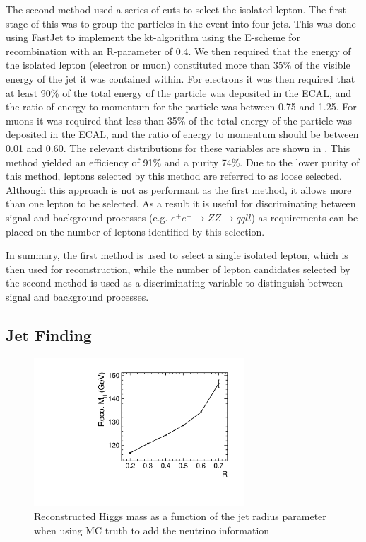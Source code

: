 The second method used a series of cuts to select the isolated lepton. The first stage of this was to group the particles in the event into four jets. This was done using FastJet \cite{Cacciari:2011ma} to implement the kt-algorithm using the E-scheme for recombination with an R-parameter of 0.4. We then required that the energy of the isolated lepton (electron or muon) constituted more than 35\% of the visible energy of the jet it was contained within. For electrons it was then required that at least 90\% of the total energy of the particle was deposited in the ECAL, and the ratio of energy to momentum for the particle was between 0.75 and 1.25. For muons it was required that less than 35\% of the total energy of the particle was deposited in the ECAL, and the ratio of energy to momentum should be between 0.01 and 0.60. The relevant distributions for these variables are shown in . This method yielded an efficiency of 91\% and a purity 74\%. Due to the lower purity of this method, leptons selected by this method are referred to as loose selected. Although this approach is not as performant as the first method, it allows more than one lepton to be selected. As a result it is useful for discriminating between signal and background processes (e.g. $e^+e^-\rightarrow ZZ\rightarrow qqll$) as requirements can be placed on the number of leptons identified by this selection.

In summary, the first method is used to select a single isolated lepton, which is then used for reconstruction, while the number of lepton candidates selected by the second method is used as a discriminating variable to distinguish between signal and background processes. 

\subsection{Jet Finding}
\label{higgsjetfinding}

\begin{figure}
  \centering
  \includegraphics[width=0.7\textwidth,keepaspectratio]{HiggsAnalysis/figures/HiggsJetOptimization.pdf}
  \caption[Jet Reconstruction Optimization]{Reconstructed Higgs mass as a function of the jet radius parameter when using MC truth to add the neutrino information}
  \label{fig:jetoptimization}
\end{figure}

